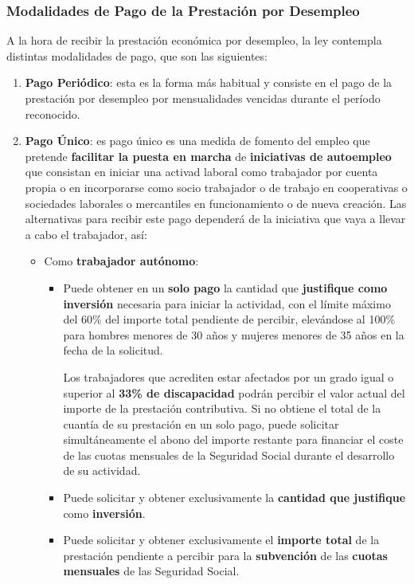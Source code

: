 \subsubsection{Modalidades de Pago de la Prestación por Desempleo}
A la hora de recibir la prestación económica por desempleo, la ley contempla distintas modalidades de pago, que son las siguientes:

\begin{enumerate}
    \item \textbf{Pago Periódico}: esta es la forma más habitual y consiste en el pago de la prestación por desempleo por mensualidades vencidas durante el período reconocido.
    \item \textbf{Pago Único}: es pago único es una medida de fomento del empleo que pretende \textbf{facilitar la puesta en marcha} de \textbf{iniciativas de autoempleo} que consistan en iniciar una activad laboral como trabajador por cuenta propia o en incorporarse como socio trabajador o de trabajo en cooperativas o sociedades laborales o mercantiles en funcionamiento o de nueva creación. Las alternativas para recibir este pago dependerá de la iniciativa que vaya a llevar a cabo el trabajador, así:

    \begin{itemize}
        \item Como \textbf{trabajador autónomo}:
        \begin{itemize}
            \item Puede obtener en un \textbf{solo pago} la cantidad que \textbf{justifique como inversión} necesaria para iniciar la actividad, con el límite máximo del 60\% del importe total pendiente de percibir, elevándose al 100\% para hombres menores de 30 años y mujeres menores de 35 años en la fecha de la solicitud.

            Los trabajadores que acrediten estar afectados por un grado igual o superior al \textbf{33\% de discapacidad} podrán percibir el valor actual del importe de la prestación contributiva. Si no obtiene el total de la cuantía de su prestación en un solo pago, puede solicitar simultáneamente el abono del importe restante para financiar el coste de las cuotas mensuales de la Seguridad Social durante el desarrollo de su actividad.
            \item Puede solicitar y obtener exclusivamente la \textbf{cantidad que justifique} como \textbf{inversión}.
            \item Puede solicitar y obtener exclusivamente el \textbf{importe total} de la prestación pendiente a percibir para la \textbf{subvención} de las \textbf{cuotas mensuales} de las Seguridad Social.
        \end{itemize}


\end{itemize}
\end{enumerate}
